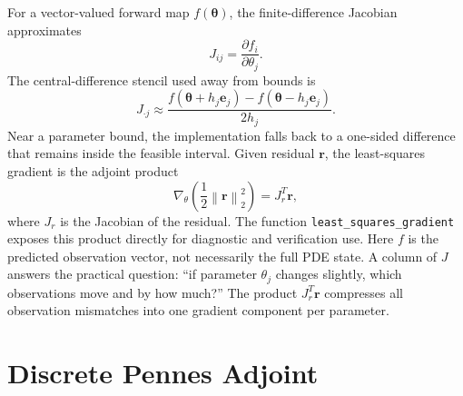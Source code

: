 \documentclass[11pt]{article}
\numberwithin{equation}{section}
\newcommand{\norm}[1]{\left\lVert #1 \right\rVert}
\begin{document}
For a vector-valued forward map $f(\bm{\theta})$, the finite-difference
Jacobian approximates
\begin{equation}
  J_{ij} =
  \frac{\partial f_i}{\partial \theta_j}.
  \label{eq:jacobian-definition}
\end{equation}
The central-difference stencil used away from bounds is
\begin{equation}
  J_{\cdot j}
  \approx
  \frac{
    f(\bm{\theta}+h_j\bm{e}_j) -
    f(\bm{\theta}-h_j\bm{e}_j)
  }{2h_j}.
  \label{eq:central-difference}
\end{equation}
Near a parameter bound, the implementation falls back to a one-sided difference
that remains inside the feasible interval.  Given residual $\bm{r}$, the
least-squares gradient is the adjoint product
\begin{equation}
  \nabla_\theta \left(\frac{1}{2}\norm{\bm{r}}_2^2\right)
  =
  J_r^T\bm{r},
  \label{eq:jt-r}
\end{equation}
where $J_r$ is the Jacobian of the residual.  The function
\texttt{least\_squares\_gradient} exposes this product directly for diagnostic
and verification use.
Here $f$ is the predicted observation vector, not necessarily the full PDE
state.  A column of $J$ answers the practical question: ``if parameter
$\theta_j$ changes slightly, which observations move and by how much?''  The
product $J_r^T\bm{r}$ compresses all observation mismatches into one gradient
component per parameter.

\section{Discrete Pennes Adjoint}
\end{document}
